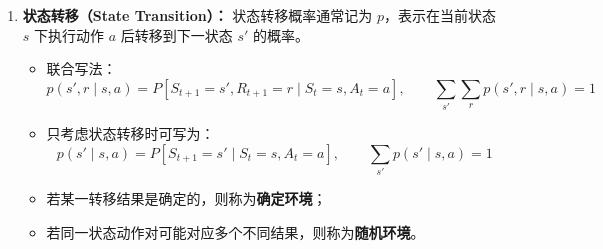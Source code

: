 \documentclass[../main.tex]{subfiles}
\begin{document}
\begin{enumerate}
\begin{enumerate}
        \item \textbf{状态转移（State Transition）：}
        状态转移概率通常记为 $p$，表示在当前状态 $s$ 下执行动作 $a$ 后转移到下一状态 $s'$ 的概率。
        \begin{itemize}
            \item 联合写法：
            $$
            p(s',r\mid s,a)=P\left[ S_{t+1}=s',R_{t+1}=r \mid S_t=s,A_t=a\right],\qquad \sum_{s'}\sum_r p(s',r\mid s,a)=1
            $$
            \item 只考虑状态转移时可写为：
            $$
            p(s'\mid s,a)=P\left[ S_{t+1}=s' \mid S_t=s,A_t=a\right],\qquad \sum_{s'} p(s'\mid s,a)=1
            $$
            \item 若某一转移结果是确定的，则称为\textbf{确定环境}；
            \item 若同一状态动作对可能对应多个不同结果，则称为\textbf{随机环境}。
        \end{itemize}


\end{enumerate}
\end{enumerate}
\end{document}

